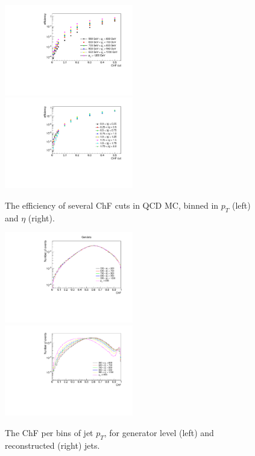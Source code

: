 \begin{figure}[h]
  \centering
  \includegraphics[width=0.5\textwidth]{figures/eff1D_pt_newtrigger.pdf}\hfill%
  \includegraphics[width=0.5\textwidth]{figures/eff1D_eta_newtrigger.pdf}
  \caption{The efficiency of several ChF cuts in QCD MC, binned in $p_T$ (left) and $\eta$ (right).}
  \label{fig:efficiencies}
\end{figure}

\begin{figure}[h]
  \centering
  \includegraphics[width=0.5\textwidth]{figures/ChFPerPtbin_GenJets.pdf}\hfill%
  \includegraphics[width=0.5\textwidth]{figures/ChFperPtbin.pdf}
  \caption{The ChF per bins of jet $p_T$, for generator level (left) and reconstructed (right) jets.}
  \label{fig:pt_dependence}
\end{figure}

